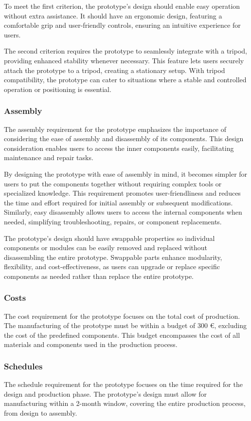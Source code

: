 To meet the first criterion, the prototype's design should enable easy operation without extra assistance. It should have an ergonomic design, featuring a comfortable grip and user-friendly controls, ensuring an intuitive experience for users.

The second criterion requires the prototype to seamlessly integrate with a tripod, providing enhanced stability whenever necessary. This feature lets users securely attach the prototype to a tripod, creating a stationary setup. With tripod compatibility, the prototype can cater to situations where a stable and controlled operation or positioning is essential.

\subsubsection{Assembly}
The assembly requirement for the prototype emphasizes the importance of considering the ease of assembly and disassembly of its components. This design consideration enables users to access the inner components easily, facilitating maintenance and repair tasks.

By designing the prototype with ease of assembly in mind, it becomes simpler for users to put the components together without requiring complex tools or specialized knowledge. This requirement promotes user-friendliness and reduces the time and effort required for initial assembly or subsequent modifications. Similarly, easy disassembly allows users to access the internal components when needed, simplifying troubleshooting, repairs, or component replacements.

The prototype's design should have swappable properties so individual components or modules can be easily removed and replaced without disassembling the entire prototype. Swappable parts enhance modularity, flexibility, and cost-effectiveness, as users can upgrade or replace specific components as needed rather than replace the entire prototype.

\subsubsection{Costs}
The cost requirement for the prototype focuses on the total cost of production. The manufacturing of the prototype must be within a budget of 300 €, excluding the cost of the predefined components. This budget encompasses the cost of all materials and components used in the production process.

\subsubsection{Schedules}
The schedule requirement for the prototype focuses on the time required for the design and production phase. The prototype's design must allow for manufacturing within a 2-month window, covering the entire production process, from design to assembly.

